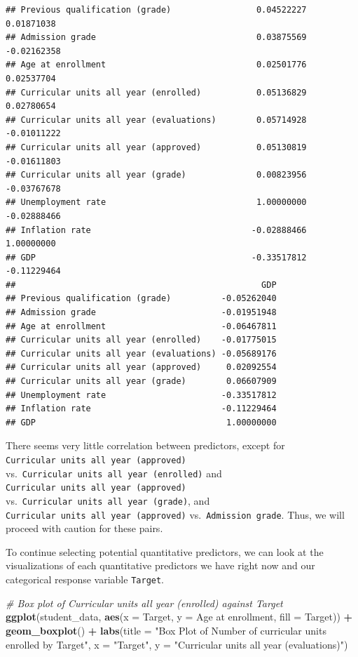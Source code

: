 \documentclass[
]{article}
\newenvironment{Shaded}{\begin{snugshade}}{\end{snugshade}}
\newcommand{\AttributeTok}[1]{\textcolor[rgb]{0.13,0.29,0.53}{#1}}
\newcommand{\CommentTok}[1]{\textcolor[rgb]{0.56,0.35,0.01}{\textit{#1}}}
\newcommand{\FunctionTok}[1]{\textcolor[rgb]{0.13,0.29,0.53}{\textbf{#1}}}
\newcommand{\NormalTok}[1]{#1}
\newcommand{\SpecialCharTok}[1]{\textcolor[rgb]{0.81,0.36,0.00}{\textbf{#1}}}
\newcommand{\StringTok}[1]{\textcolor[rgb]{0.31,0.60,0.02}{#1}}
\begin{document}
\begin{verbatim}
## Previous qualification (grade)                 0.04522227     0.01871038
## Admission grade                                0.03875569    -0.02162358
## Age at enrollment                              0.02501776     0.02537704
## Curricular units all year (enrolled)           0.05136829     0.02780654
## Curricular units all year (evaluations)        0.05714928    -0.01011222
## Curricular units all year (approved)           0.05130819    -0.01611803
## Curricular units all year (grade)              0.00823956    -0.03767678
## Unemployment rate                              1.00000000    -0.02888466
## Inflation rate                                -0.02888466     1.00000000
## GDP                                           -0.33517812    -0.11229464
##                                                 GDP
## Previous qualification (grade)          -0.05262040
## Admission grade                         -0.01951948
## Age at enrollment                       -0.06467811
## Curricular units all year (enrolled)    -0.01775015
## Curricular units all year (evaluations) -0.05689176
## Curricular units all year (approved)     0.02092554
## Curricular units all year (grade)        0.06607909
## Unemployment rate                       -0.33517812
## Inflation rate                          -0.11229464
## GDP                                      1.00000000
\end{verbatim}

There seems very little correlation between predictors, except for
\texttt{Curricular\ units\ all\ year\ (approved)}
vs.~\texttt{Curricular\ units\ all\ year\ (enrolled)} and
\texttt{Curricular\ units\ all\ year\ (approved)}
vs.~\texttt{Curricular\ units\ all\ year\ (grade)}, and
\texttt{Curricular\ units\ all\ year\ (approved)}
vs.~\texttt{Admission\ grade}. Thus, we will proceed with caution for
these pairs.

To continue selecting potential quantitative predictors, we can look at
the visualizations of each quantitative predictors we have right now and
our categorical response variable \texttt{Target}.

\begin{Shaded}
\begin{Highlighting}[]
\CommentTok{\# Box plot of Curricular units all year (enrolled) against \textquotesingle{}Target\textquotesingle{}}
\FunctionTok{ggplot}\NormalTok{(student\_data, }\FunctionTok{aes}\NormalTok{(}\AttributeTok{x =}\NormalTok{ Target, }\AttributeTok{y =} \StringTok{\textasciigrave{}}\AttributeTok{Age at enrollment}\StringTok{\textasciigrave{}}\NormalTok{, }\AttributeTok{fill =}\NormalTok{ Target)) }\SpecialCharTok{+} 
  \FunctionTok{geom\_boxplot}\NormalTok{() }\SpecialCharTok{+}
  \FunctionTok{labs}\NormalTok{(}\AttributeTok{title =} \StringTok{"Box Plot of Number of curricular units enrolled by Target"}\NormalTok{, }\AttributeTok{x =} \StringTok{"Target"}\NormalTok{, }\AttributeTok{y =} \StringTok{"Curricular units all year (evaluations)"}\NormalTok{)}
\end{Highlighting}
\end{Shaded}
\end{document}
